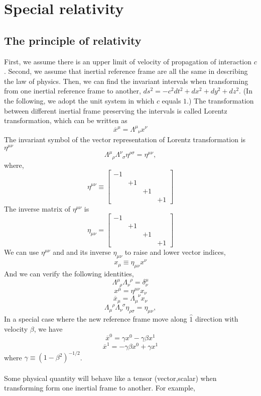 \chapter{Special relativity}
\section{The principle of relativity}
First, we assume there is an upper limit of velocity of propagation of interaction $c$. Second, we assume that inertial reference frame are all the same in describing the law of physics. Then, we can find the invariant intervals when transforming from one inertial reference frame to another, $ds^2 = -c^2 dt^2 + dx^2 + dy^2 + dz^2$. 
(In the following, we adopt the unit system in which $c$ equals $1$.) The transformation between different inertial frame preserving the intervals is called Lorentz transformation, which can be written as
\[\overline{x}^{\mu} = \Lambda^{\mu}_{\phantom{\mu}\nu} x^{\nu}\]
The invariant symbol of the vector representation of Lorentz transformation is $\eta^{\mu \nu}$
\[\Lambda^{\mu}_{\phantom{\mu}\rho}  \Lambda^{\nu}_{\phantom{\nu}\sigma}  \eta^{\rho \sigma} = \eta^{\mu \nu},\]
where,
\[\eta^{\mu \nu} \equiv \left[ 
\begin{matrix} 
-1& & & \\ 
& +1 & & \\
& & +1 & \\
& & & +1
\end{matrix} 
\right]\]
The inverse matrix of $\eta^{\mu \nu}$ is
\[\eta_{\mu \nu} = \left[ 
\begin{matrix} 
-1& & & \\ 
& +1 & & \\
& & +1 & \\
& & & +1
\end{matrix} 
\right]\]
We can use $\eta^{\mu \nu}$ and and its inverse $\eta_{\mu \nu}$ to raise and lower vector indices, 
\[x_{\mu} \equiv \eta_{\mu \nu} x^{\nu}\]
And we can verify the following identities,
\[\Lambda^{\mu}_{\phantom{\rho}\rho} \Lambda_{\nu}^{\phantom{\rho}\rho} = \delta^{\mu}_{\nu} \]
\[x^{\mu} = \eta^{\mu \nu} x_{\nu}\]
\[\overline{x}_{\mu} = \Lambda_{\mu}^{\phantom{\mu}\nu} x_{\nu}\]
\[\Lambda_{\mu}^{\phantom{\mu}\rho}  \Lambda_{\nu}^{\phantom{\nu}\sigma}  \eta_{\rho \sigma} = \eta_{\mu \nu},\]
In a special case where the new reference frame move along $\hat{1}$ direction with velocity $\beta$, we have
\[\overline{x}^{0} = \gamma x^0 - \gamma \beta x^1\]
\[\overline{x}^{1} = -\gamma \beta x^0 + \gamma x^1\]
where $\gamma \equiv (1-\beta^2)^{-1/2}$.
\\ \\
Some physical quantity will behave like a tensor (vector,scalar) when transforming form one inertial frame to another. For example,
